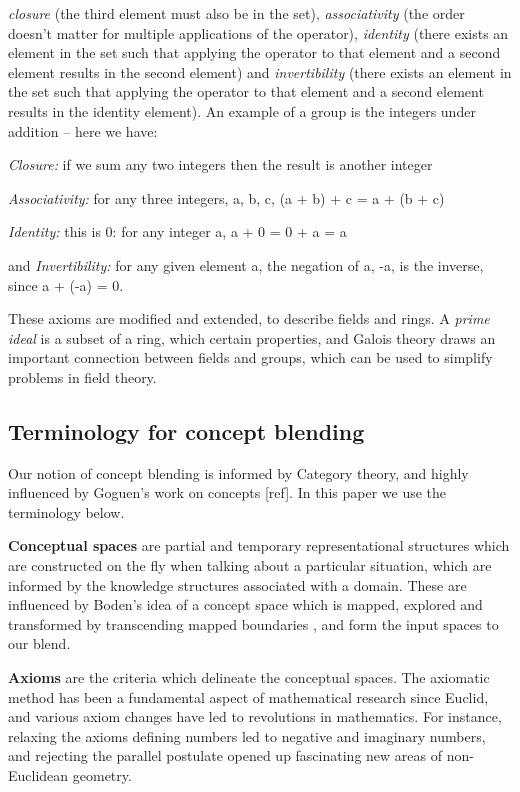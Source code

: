 {\em closure} (the third element must also be in the set), {\em
associativity} (the order doesn't matter for multiple applications of
the operator), {\em identity} (there exists an element in the set such
that applying the operator to that element and a second element
results in the second element) and {\em invertibility} (there exists
an element in the set such that applying the operator to that element
and a second element results in the identity element). An example of a
group is the integers under addition -- here we have:

{\em Closure:} if we sum any two integers then the result is another integer

{\em Associativity:} for any three integers, a, b, c, (a + b) + c = a +
(b + c)

{\em Identity:} this is 0: for any integer a, a + 0 = 0 + a = a

and {\em Invertibility:} for any given element a, the negation of a,
-a, is the inverse, since a + (-a) = 0.

These axioms are modified and extended, to describe fields and
rings. A {\em prime ideal} is a subset of a ring, which certain
properties, and Galois theory draws an important connection between
fields and groups, which can be used to simplify problems in field
theory. 

\subsection{Terminology for concept blending}
Our notion of concept blending is informed by Category theory, and
highly influenced by Goguen's work on concepts [ref]. In this paper we
use the terminology below.

{\bf Conceptual spaces} are partial and temporary representational
structures which are constructed on the fly when talking about a
particular situation, which are informed by the knowledge structures
associated with a domain. These are influenced by Boden's idea of a
concept space which is mapped, explored and transformed by
transcending mapped boundaries \cite{boden}, and form the input spaces
to our blend.

{\bf Axioms} are the criteria which delineate the conceptual
spaces. The axiomatic method has been a fundamental aspect of
mathematical research since Euclid, and various axiom changes have led
to revolutions in mathematics. For instance, relaxing the axioms
defining numbers led to negative and imaginary numbers, and rejecting
the parallel postulate opened up fascinating new areas of
non-Euclidean geometry.

